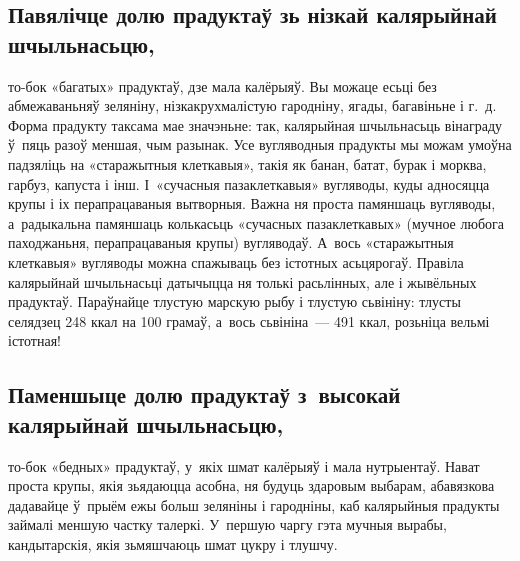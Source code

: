 \subsection{Павялічце долю прадуктаў зь нізкай калярыйнай шчыльнасьцю,} то-бок «багатых» прадуктаў, дзе мала калёрыяў. Вы можаце есьці без абмежаваньняў зеляніну, нізкакрухмалістую гародніну, ягады, багавіньне і г.~д. Форма прадукту таксама мае значэньне: так, калярыйная шчыльнасьць вінаграду ў~пяць разоў меншая, чым разынак. Усе вугляводныя прадукты мы можам умоўна падзяліць на «старажытныя клеткавыя», такія як банан, батат, бурак і морква, гарбуз, капуста і інш. І~«сучасныя пазаклеткавыя» вугляводы, куды адносяцца крупы і іх перапрацаваныя вытворныя. Важна ня проста памяншаць вугляводы, а~радыкальна памяншаць колькасьць «сучасных пазаклеткавых» (мучное любога паходжаньня, перапрацаваныя крупы) вугляводаў. А~вось «старажытныя клеткавыя» вугляводы можна спажываць без істотных асьцярогаў. Правіла калярыйнай шчыльнасьці датычыцца ня толькі расьлінных, але і жывёльных прадуктаў. Параўнайце тлустую марскую рыбу і тлустую сьвініну: тлусты селядзец 248 ккал на 100 грамаў, а~вось сьвініна~--- 491 ккал, розьніца вельмі істотная!

\subsection{Паменшыце долю прадуктаў з~высокай калярыйнай шчыльнасьцю,} то-бок «бедных» прадуктаў, у~якіх шмат калёрыяў і мала нутрыентаў. Нават проста крупы, якія зьядаюцца асобна, ня будуць здаровым выбарам, абавязкова дадавайце ў~прыём ежы больш зеляніны і гародніны, каб калярыйныя прадукты займалі меншую частку талеркі. У~першую чаргу гэта мучныя вырабы, кандытарскія, якія зьмяшчаюць шмат цукру і тлушчу.


